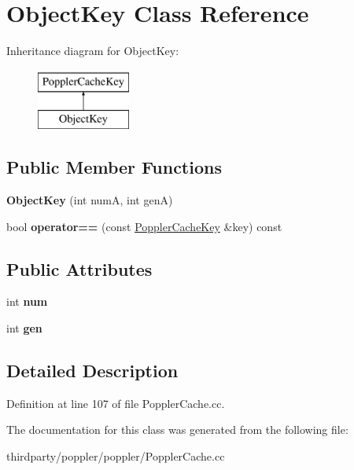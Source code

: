 \hypertarget{class_object_key}{}\section{Object\+Key Class Reference}
\label{class_object_key}
Inheritance diagram for Object\+Key\+:\begin{figure}[H]
\begin{center}
\leavevmode
\includegraphics[height=2.000000cm]{class_object_key}
\end{center}
\end{figure}
\subsection*{Public Member Functions}
\begin{DoxyCompactItemize}
\item 
\mbox{\label{class_object_key_a6b67c4fb81e34ad5a0b9575a5217632f}} 
{\bfseries Object\+Key} (int numA, int genA)
\item 
\mbox{\label{class_object_key_aeb62a9dbfb2d19e8ad78f39b5948f7cb}} 
bool {\bfseries operator==} (const \hyperlink{class_poppler_cache_key}{Poppler\+Cache\+Key} \&key) const
\end{DoxyCompactItemize}
\subsection*{Public Attributes}
\begin{DoxyCompactItemize}
\item 
\mbox{\label{class_object_key_aa6f7df901c81694b3d8fb00521738e3f}} 
int {\bfseries num}
\item 
\mbox{\label{class_object_key_afa00edbe7ae73d9ff3c1da61faf55efe}} 
int {\bfseries gen}
\end{DoxyCompactItemize}


\subsection{Detailed Description}


Definition at line 107 of file Poppler\+Cache.\+cc.



The documentation for this class was generated from the following file\+:\begin{DoxyCompactItemize}
\item 
thirdparty/poppler/poppler/Poppler\+Cache.\+cc\end{DoxyCompactItemize}
